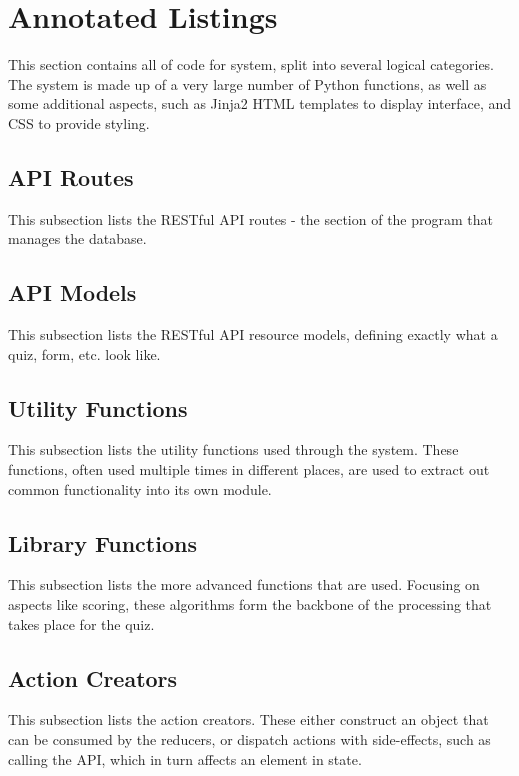 \section{Annotated Listings}
This section contains all of code for system, split into several logical categories. The system is made up of a very large number of Python functions, as well as some additional aspects, such as Jinja2 HTML templates to display interface, and CSS to provide styling.

\subsection{API Routes} %
\label{sub:api_routes}
This subsection lists the RESTful API routes - the section of the program that manages the database.


\subsection{API Models} %
\label{sub:api_models}
This subsection lists the RESTful API resource models, defining exactly what a quiz, form, etc. look like.


\subsection{Utility Functions} %
\label{sub:utility_functions}
This subsection lists the utility functions used through the system. These functions, often used multiple times in different places, are used to extract out common functionality into its own module.


\subsection{Library Functions} %
\label{sub:library_functions}
This subsection lists the more advanced functions that are used. Focusing on aspects like scoring, these algorithms form the backbone of the processing that takes place for the quiz.


\subsection{Action Creators} %
\label{sub:action_creators}
This subsection lists the action creators. These either construct an object that can be consumed by the reducers, or dispatch actions with side-effects, such as calling the API, which in turn affects an element in state.


